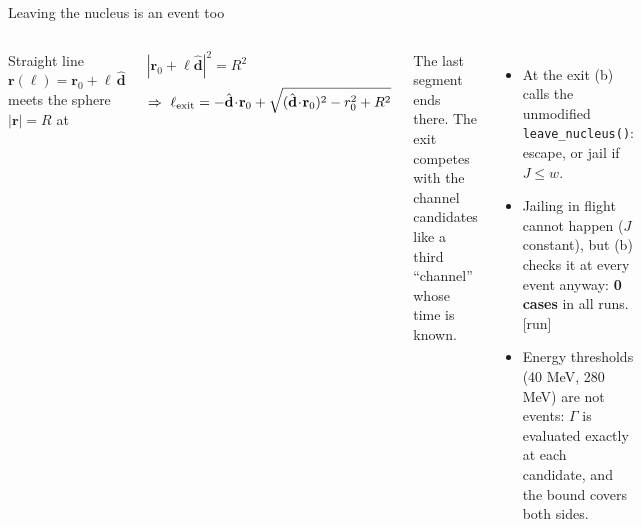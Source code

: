 \documentclass[10pt,aspectratio=169]{beamer}
\newcommand{\G}{\Gamma}
\newcommand{\code}[1]{{\small\texttt{#1}}}
\newcommand{\tagrun}{{\scriptsize\color{okGreen}[run]}}
\begin{document}
\begin{frame}{Leaving the nucleus is an event too}
\begin{columns}[T]
Straight line $\mathbf r(\ell)=\mathbf r_0+\ell\,\hat{\mathbf d}$ meets the sphere $|\mathbf r|=R$ at
\begin{derivbox}
$|\mathbf r_0+\ell\hat{\mathbf d}|^2=R^2$
\[
\Rightarrow\ \ell_{\rm exit}=-\hat{\mathbf d}\!\cdot\!\mathbf r_0+\sqrt{(\hat{\mathbf d}\!\cdot\!\mathbf r_0)^2-r_0^2+R^2}
\]
\end{derivbox}
The last segment ends there. The exit competes with the channel candidates like a third ``channel'' whose time is known.
\begin{itemize}
\item At the exit (b) calls the unmodified \code{leave\_nucleus()}: escape, or jail if $J\le w$.
\item Jailing in flight cannot happen ($J$ constant), but (b) checks it at every event anyway: \textbf{0 cases} in all runs. \tagrun
\item Energy thresholds (40 MeV, 280 MeV) are not events: $\G$ is evaluated exactly at each candidate, and the bound covers both sides.
\end{itemize}
\end{columns}
\end{frame}
\end{document}
